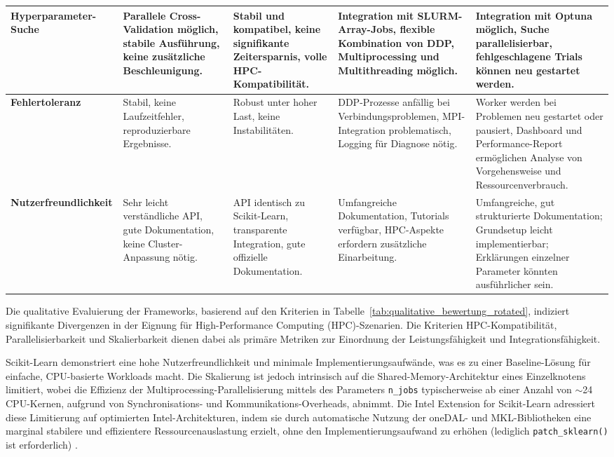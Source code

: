 \documentclass{article}
\begin{document}
\begin{table}[H]
{\begin{tabular}{p{}p{}p{}p{}p{}}
\midrule
\textbf{Hyperparameter-Suche} & Parallele Cross-Validation möglich, stabile Ausführung, keine zusätzliche Beschleunigung. & Stabil und kompatibel, keine signifikante Zeitersparnis, volle HPC-Kompatibilität. & Integration mit SLURM-Array-Jobs, flexible Kombination von DDP, Multiprocessing und Multithreading möglich. & Integration mit Optuna möglich, Suche parallelisierbar, fehlgeschlagene Trials können neu gestartet werden. \\
\midrule
\textbf{Fehlertoleranz} & Stabil, keine Laufzeitfehler, reproduzierbare Ergebnisse. & Robust unter hoher Last, keine Instabilitäten. & DDP-Prozesse anfällig bei Verbindungsproblemen, MPI-Integration problematisch, Logging für Diagnose nötig. & Worker werden bei Problemen neu gestartet oder pausiert, Dashboard und Performance-Report ermöglichen Analyse von Vorgehensweise und Ressourcenverbrauch. \\
\midrule
\textbf{Nutzerfreundlichkeit} & Sehr leicht verständliche API, gute Dokumentation, keine Cluster-Anpassung nötig. & API identisch zu Scikit-Learn, transparente Integration, gute offizielle Dokumentation. & Umfangreiche Dokumentation, Tutorials verfügbar, HPC-Aspekte erfordern zusätzliche Einarbeitung. & Umfangreiche, gut strukturierte Dokumentation; Grundsetup leicht implementierbar; Erklärungen einzelner Parameter könnten ausführlicher sein. \\
\bottomrule
\end{tabular}
}
\end{table}

Die qualitative Evaluierung der Frameworks, basierend auf den Kriterien in 
Tabelle~\ref{tab:qualitative_bewertung_rotated}, indiziert signifikante 
Divergenzen in der Eignung für High-Performance Computing (HPC)-Szenarien. 
Die Kriterien HPC-Kompatibilität, Parallelisierbarkeit und Skalierbarkeit dienen 
dabei als primäre Metriken zur Einordnung der Leistungsfähigkeit und Integrationsfähigkeit.

Scikit-Learn demonstriert eine hohe Nutzerfreundlichkeit und minimale 
Implementierungsaufwände, was es zu einer Baseline-Lösung für einfache, 
CPU-basierte Workloads macht. Die Skalierung ist jedoch intrinsisch auf 
die Shared-Memory-Architektur eines Einzelknotens limitiert, wobei die 
Effizienz der Multiprocessing-Parallelisierung mittels des Parameters 
\texttt{n\_jobs} typischerweise ab einer Anzahl von $\sim$24 CPU-Kernen, 
aufgrund von Synchronisations- und Kommunikations-Overheads, 
abnimmt. Die Intel Extension for Scikit-Learn adressiert diese Limitierung 
auf optimierten Intel-Architekturen, indem sie durch automatische Nutzung 
der oneDAL- und MKL-Bibliotheken eine marginal stabilere und effizientere 
Ressourcenauslastung erzielt, ohne den Implementierungsaufwand zu erhöhen 
(lediglich \texttt{patch\_sklearn()} ist erforderlich) \parencite{intel_extension_medium_2021}.
\end{document}
